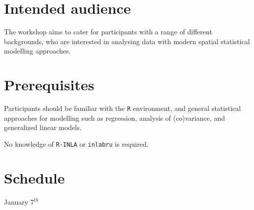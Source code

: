 \documentclass[
  letterpaper,
  DIV=11,
  numbers=noendperiod]{scrartcl}
\makeatletter
\let\oldparagraph\paragraph
\renewcommand{\paragraph}{
    \@ifstar
      \xxxParagraphStar
      \xxxParagraphNoStar
  }
\newcommand{\xxxParagraphStar}[1]{\oldparagraph*{#1}\mbox{}}
\newcommand{\xxxParagraphNoStar}[1]{\oldparagraph{#1}\mbox{}}
\makeatother
\begin{document}
\section{Intended audience}\label{intended-audience}

The workshop aims to cater for participants with a range of different
backgrounds, who are interested in analysing data with modern spatial
statistical modelling approaches.

\section{Prerequisites}\label{prerequisites}

Participants should be familiar with the \texttt{R} environment, and
general statistical approaches for modelling such as regression,
analysis of (co)variance, and generalized linear models.

No knowledge of \texttt{R-INLA} or \texttt{inlabru} is required.

\section{Schedule}\label{schedule-tabs}

\paragraph{\texorpdfstring{January
7\(^{th}\)}{January 7\^{}\{th\}}}\label{january-7th}
\end{document}

